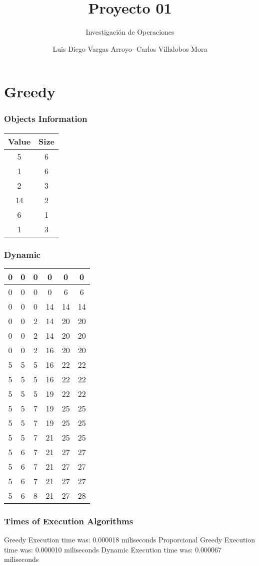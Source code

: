 \documentclass[12]{beamer}
\title{Proyecto 01}
\subtitle{Investigación de Operaciones}
\author{Luis Diego Vargas Arroyo- Carlos Villalobos Mora}
\begin{document}
\frame{\titlepage}
\section{Greedy}
\begin{frame}
\frametitle{Objects Information}

\begin{center}
\begin{adjustbox}{max width=\textwidth}
\small
\begin{tabular}{ |c|c| }
\hline
    Value     &     Size     \\\hline
\hline
  5  & 6 \\ 
\hline
  1  & 6 \\ 
\hline
  2  & 3 \\ 
\hline
  14  & 2 \\ 
\hline
  6  & 1 \\ 
\hline
  1  & 3 \\ 
\hline
\end{tabular}
\end{adjustbox}
\end{center}

\end{frame}
\begin{frame}
\frametitle{Dynamic}

\begin{center}
\begin{adjustbox}{max width=\textwidth}
\small
\begin{tabular}{ |c|c|c|c|c|c|}
\hline
 0 & 0 & 0 & 0 & 0 & 0 \\ 
\hline
 0 & 0 & 0 & 0 & 6 & 6 \\ 
\hline
 0 & 0 & 0 & 14 & 14 & 14 \\ 
\hline
 0 & 0 & 2 & 14 & 20 & 20 \\ 
\hline
 0 & 0 & 2 & 14 & 20 & 20 \\ 
\hline
 0 & 0 & 2 & 16 & 20 & 20 \\ 
\hline
 5 & 5 & 5 & 16 & 22 & 22 \\ 
\hline
 5 & 5 & 5 & 16 & 22 & 22 \\ 
\hline
 5 & 5 & 5 & 19 & 22 & 22 \\ 
\hline
 5 & 5 & 7 & 19 & 25 & 25 \\ 
\hline
 5 & 5 & 7 & 19 & 25 & 25 \\ 
\hline
 5 & 5 & 7 & 21 & 25 & 25 \\ 
\hline
 5 & 6 & 7 & 21 & 27 & 27 \\ 
\hline
 5 & 6 & 7 & 21 & 27 & 27 \\ 
\hline
 5 & 6 & 7 & 21 & 27 & 27 \\ 
\hline
 5 & 6 & 8 & 21 & 27 & 28 \\ 
\hline
\end{tabular}
\end{adjustbox}
\end{center}

\end{frame}
\begin{frame}
\frametitle{Times of Execution Algorithms}

\begin{center}
Greedy Execution time was:  0.000018 miliseconds 
\newline
Proporcional Greedy Execution time was:  0.000010    miliseconds
Dynamic Execution time was:  0.000067  miliseconds 
\end{center}

\end{frame}
\end{document}
